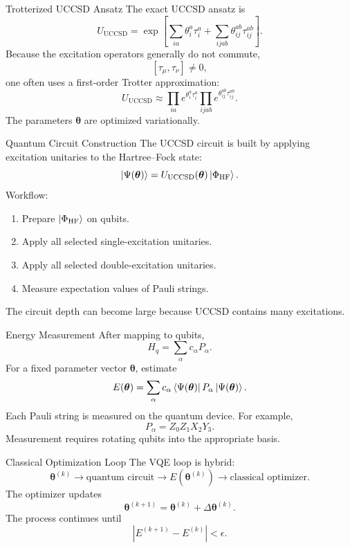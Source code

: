 \documentclass[aspectratio=169]{beamer}
\begin{document}
\begin{frame}{Trotterized UCCSD Ansatz}
The exact UCCSD ansatz is
\[
U_{\mathrm{UCCSD}}
=
\exp
\left[
\sum_{ia}\theta_i^a \tau_i^a
+
\sum_{ijab}\theta_{ij}^{ab}\tau_{ij}^{ab}
\right].
\]
\vspace{0.3cm}
Because the excitation operators generally do not commute,
\[
[\tau_\mu,\tau_\nu]\neq 0,
\]
one often uses a first-order Trotter approximation:
\[
U_{\mathrm{UCCSD}}
\approx
\prod_{ia}
e^{\theta_i^a\tau_i^a}
\prod_{ijab}
e^{\theta_{ij}^{ab}\tau_{ij}^{ab}}.
\]
\vspace{0.3cm}
The parameters \(\bm{\theta}\) are optimized variationally.
\end{frame}
\begin{frame}{Quantum Circuit Construction}
The UCCSD circuit is built by applying excitation unitaries to the Hartree--Fock state:
\[
\ket{\Psi(\bm{\theta})}
=
U_{\mathrm{UCCSD}}(\bm{\theta})
\ket{\Phi_{\mathrm{HF}}}.
\]
\vspace{0.3cm}
Workflow:
\begin{enumerate}
\item Prepare \(\ket{\Phi_{\mathrm{HF}}}\) on qubits.
\item Apply all selected single-excitation unitaries.
\item Apply all selected double-excitation unitaries.
\item Measure expectation values of Pauli strings.
\end{enumerate}
\vspace{0.3cm}
The circuit depth can become large because UCCSD contains many excitations.
\end{frame}
\begin{frame}{Energy Measurement}
After mapping to qubits,
\[
H_q=\sum_\alpha c_\alpha P_\alpha .
\]
For a fixed parameter vector \(\bm{\theta}\), estimate
\[
E(\bm{\theta})
=
\sum_\alpha c_\alpha
\bra{\Psi(\bm{\theta})}
P_\alpha
\ket{\Psi(\bm{\theta})}.
\]
\vspace{0.3cm}
Each Pauli string is measured on the quantum device.
\vspace{0.3cm}
For example,
\[
P_\alpha = Z_0 Z_1 X_2 Y_3.
\]
Measurement requires rotating qubits into the appropriate basis.
\end{frame}
\begin{frame}{Classical Optimization Loop}
The VQE loop is hybrid:
\[
\bm{\theta}^{(k)}
\longrightarrow
\text{quantum circuit}
\longrightarrow
E(\bm{\theta}^{(k)})
\longrightarrow
\text{classical optimizer}.
\]
\vspace{0.4cm}
The optimizer updates
\[
\bm{\theta}^{(k+1)}
=
\bm{\theta}^{(k)}
+
\Delta \bm{\theta}^{(k)}.
\]
\vspace{0.4cm}
The process continues until
\[
|E^{(k+1)}-E^{(k)}| < \epsilon.
\]
\end{frame}
\end{document}
